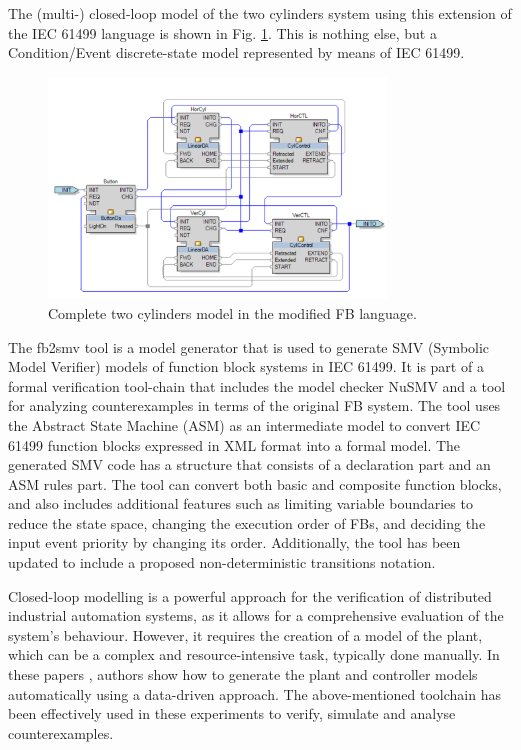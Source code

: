 \begin{bibunit}
The (multi-) closed-loop model of the two cylinders system using this extension of the IEC 61499 language is shown in Fig. \ref{fig:twocylindersfb}. This is nothing else, but a Condition/Event discrete-state model represented by means of IEC 61499. 

\begin{figure}
    \centering
    \includegraphics[width=0.8\textwidth]{MX_Papers/Paper1/images/twocylindersfb.PNG}
    \caption{Complete two cylinders model in the modified FB language.}
    \label{fig:twocylindersfb}
\end{figure}

The fb2smv tool is a model generator that is used to generate SMV (Symbolic Model Verifier) models of function block systems in IEC 61499. It is part of a formal verification tool-chain that includes the model checker NuSMV and a tool for analyzing counterexamples in terms of the original FB system. The tool uses the Abstract State Machine (ASM) as an intermediate model to convert IEC 61499 function blocks expressed in XML format into a formal model. The generated SMV code has a structure that consists of a declaration part and an ASM rules part. The tool can convert both basic and composite function blocks, and also includes additional features such as limiting variable boundaries to reduce the state space, changing the execution order of FBs, and deciding the input event priority by changing its order. Additionally, the tool has been updated to include a proposed non-deterministic transitions notation.

Closed-loop modelling is a powerful approach for the verification of distributed industrial automation systems, as it allows for a comprehensive evaluation of the system's behaviour. However, it requires the creation of a model of the plant, which can be a complex and resource-intensive task, typically done manually. In these papers \cite{xavier2021plant,xavier2022process,xavier2022interactive,xavier2022plant}, authors show how to generate the plant and controller models automatically using a data-driven approach. The above-mentioned toolchain has been effectively used in these experiments to verify, simulate and analyse counterexamples. 


\end{bibunit}
